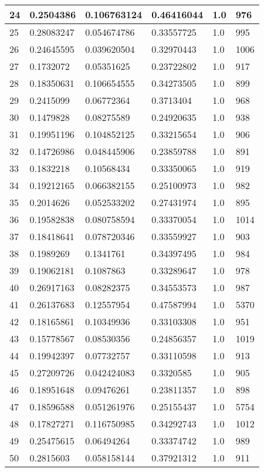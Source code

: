 \begin{longtable}{|l|l|l|l|l|l|}
24 & 0.2504386 & 0.106763124 & 0.46416044 & 1.0 & 976 \\ \hline 
25 & 0.28083247 & 0.054674786 & 0.33557725 & 1.0 & 995 \\ \hline 
26 & 0.24645595 & 0.039620504 & 0.32970443 & 1.0 & 1006 \\ \hline 
27 & 0.1732072 & 0.05351625 & 0.23722802 & 1.0 & 917 \\ \hline 
28 & 0.18350631 & 0.106654555 & 0.34273505 & 1.0 & 899 \\ \hline 
29 & 0.2415099 & 0.06772364 & 0.3713404 & 1.0 & 968 \\ \hline 
30 & 0.1479828 & 0.08275589 & 0.24920635 & 1.0 & 938 \\ \hline 
31 & 0.19951196 & 0.104852125 & 0.33215654 & 1.0 & 906 \\ \hline 
32 & 0.14726986 & 0.048445906 & 0.23859788 & 1.0 & 891 \\ \hline 
33 & 0.1832218 & 0.10568434 & 0.33350065 & 1.0 & 919 \\ \hline 
34 & 0.19212165 & 0.066382155 & 0.25100973 & 1.0 & 982 \\ \hline 
35 & 0.2014626 & 0.052533202 & 0.27431974 & 1.0 & 895 \\ \hline 
36 & 0.19582838 & 0.080758594 & 0.33370054 & 1.0 & 1014 \\ \hline 
37 & 0.18418641 & 0.078720346 & 0.33559927 & 1.0 & 903 \\ \hline 
38 & 0.1989269 & 0.1341761 & 0.34397495 & 1.0 & 984 \\ \hline 
39 & 0.19062181 & 0.1087863 & 0.33289647 & 1.0 & 978 \\ \hline 
40 & 0.26917163 & 0.08282375 & 0.34553573 & 1.0 & 987 \\ \hline 
41 & 0.26137683 & 0.12557954 & 0.47587994 & 1.0 & 5370 \\ \hline 
42 & 0.18165861 & 0.10349936 & 0.33103308 & 1.0 & 951 \\ \hline 
43 & 0.15778567 & 0.08530356 & 0.24856357 & 1.0 & 1019 \\ \hline 
44 & 0.19942397 & 0.07732757 & 0.33110598 & 1.0 & 913 \\ \hline 
45 & 0.27209726 & 0.042424083 & 0.3320585 & 1.0 & 905 \\ \hline 
46 & 0.18951648 & 0.09476261 & 0.23811357 & 1.0 & 898 \\ \hline 
47 & 0.18596588 & 0.051261976 & 0.25155437 & 1.0 & 5754 \\ \hline 
48 & 0.17827271 & 0.116750985 & 0.34292743 & 1.0 & 1012 \\ \hline 
49 & 0.25475615 & 0.06494264 & 0.33374742 & 1.0 & 989 \\ \hline 
50 & 0.2815603 & 0.058158144 & 0.37921312 & 1.0 & 911 \\ \hline 
\end{longtable}
